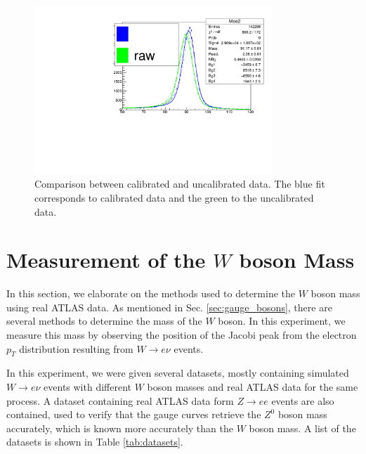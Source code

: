 \documentclass[a4paper]{report}
\numberwithin{equation}{section}
\begin{document}
\begin{figure}[htpb]
    \centering
    \includegraphics[width=0.8\textwidth]{calib_compare}
    \caption{Comparison between calibrated and uncalibrated data. The blue fit corresponds to calibrated data and the green to the uncalibrated data.}
    \label{fig:calib-compare}
\end{figure}

\chapter{Measurement of the $W$ boson Mass} \label{chap:wboson}

In this section, we elaborate on the methods used to determine the $W$ boson mass using real ATLAS data. As mentioned in Sec. 
\ref{sec:gauge_bosons}, there are several methods to determine the mass of the $W$ boson. In this experiment, we measure this 
mass by observing the position of the Jacobi peak from the electron $p_T$ distribution resulting from $W \rightarrow e\nu$ 
events. \par 

In this experiment, we were given several datasets, mostly containing simulated $W \rightarrow e\nu$ events with 
different $W$ boson masses and real ATLAS data for the same process. A dataset containing real ATLAS data 
form $Z \rightarrow ee$ events are also contained, used to verify that the gauge curves retrieve the $Z^0$ boson mass accurately, which 
is known more accurately than the $W$ boson mass. A list of the datasets is shown in Table \ref{tab:datasets}. 
\end{document}
